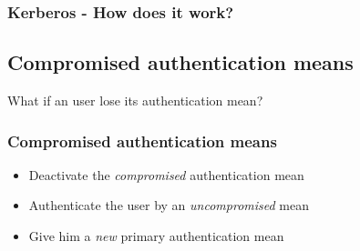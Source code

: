 \begin{frame}
\frametitle{Kerberos - How does it work?}
\end{frame}

\subsection{Compromised authentication means}

\begin{frametransition}{What if an user lose its authentication mean?}
\vspace{1em}
\centering{}
\end{frametransition}

\begin{frame}
\frametitle{Compromised authentication means}
\begin{itemize}
\item<+-> Deactivate the \emph{compromised} authentication mean
\item<+-> Authenticate the user by an \emph{uncompromised} mean
\item<+-> Give him a \emph{new} primary authentication mean
\end{itemize}
\end{frame}

